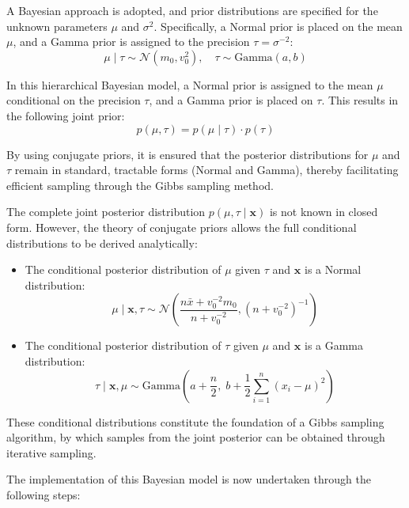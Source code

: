 \documentclass[]{article}
\begin{document}
A Bayesian approach is adopted, and prior distributions are specified for the unknown parameters $\mu$ and $\sigma^2$. Specifically, a Normal prior is placed on the mean $\mu$, and a Gamma prior is assigned to the precision $\tau = \sigma^{-2}$:
$$
\mu \mid \tau \sim \mathcal{N}(m_0, v_0^2), \quad \tau \sim \text{Gamma}(a, b)
$$

In this hierarchical Bayesian model, a Normal prior is assigned to the mean $\mu$ conditional on the precision $\tau$, and a Gamma prior is placed on $\tau$. This results in the following joint prior:
$$
p(\mu, \tau) = p(\mu \mid \tau) \cdot p(\tau)
$$

By using conjugate priors, it is ensured that the posterior distributions for $\mu$ and $\tau$ remain in standard, tractable forms (Normal and Gamma), thereby facilitating efficient sampling through the Gibbs sampling method.

The complete joint posterior distribution $p(\mu, \tau \mid \mathbf{x})$ is not known in closed form. However, the theory of conjugate priors allows the full conditional distributions to be derived analytically:

\begin{itemize}
	\item The conditional posterior distribution of $\mu$ given $\tau$ and $\mathbf{x}$ is a Normal distribution:
	$$
	\mu \mid \mathbf{x}, \tau \sim \mathcal{N}\left( \frac{n \bar{x} + v_0^{-2} m_0}{n + v_0^{-2}}, \left(n + v_0^{-2} \right)^{-1} \right)
	$$
	\item The conditional posterior distribution of $\tau$ given $\mu$ and $\mathbf{x}$ is a Gamma distribution:
	$$
	\tau \mid \mathbf{x}, \mu \sim \text{Gamma} \left( a + \frac{n}{2}, \; b + \frac{1}{2} \sum_{i=1}^n (x_i - \mu)^2 \right)
	$$
\end{itemize}

\noindent These conditional distributions constitute the foundation of a Gibbs sampling algorithm, by which samples from the joint posterior can be obtained through iterative sampling.

The implementation of this Bayesian model is now undertaken through the following steps:
\end{document}
